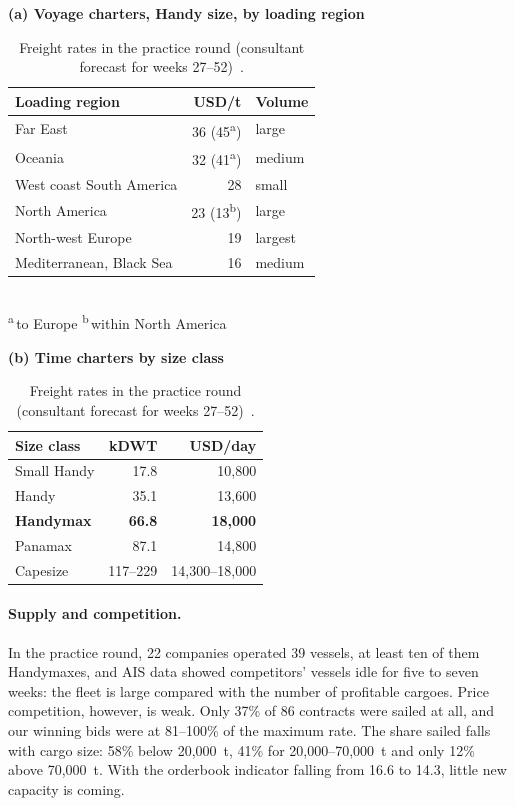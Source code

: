 \begin{table}[tbp]
  \centering\small
  \caption{Freight rates in the practice round (consultant forecast for weeks 27--52)~\cite{MBGpractice}.}
  \label{tab:rates}
  \begin{minipage}[t]{0.53\textwidth}
    \centering
    \textbf{(a) Voyage charters, Handy size, by loading region}\\[3pt]
    \begin{tabular}{@{}lrl@{}}
      \toprule
      Loading region & USD/t & Volume \\
      \midrule
      Far East                  & 36 (45\textsuperscript{a}) & large \\
      Oceania                   & 32 (41\textsuperscript{a}) & medium \\
      West coast South America  & 28 & small \\
      North America             & 23 (13\textsuperscript{b}) & large \\
      North-west Europe         & 19 & largest \\
      Mediterranean, Black Sea  & 16 & medium \\
      \bottomrule
    \end{tabular}\\[2pt]
    {\footnotesize \textsuperscript{a}\,to Europe \quad \textsuperscript{b}\,within North America}
  \end{minipage}\hfill
  \begin{minipage}[t]{0.43\textwidth}
    \centering
    \textbf{(b) Time charters by size class}\\[3pt]
    \begin{tabular}{@{}lrr@{}}
      \toprule
      Size class & kDWT & USD/day \\
      \midrule
      Small Handy      & 17.8    & 10,800 \\
      Handy            & 35.1    & 13,600 \\
      \textbf{Handymax} & \textbf{66.8} & \textbf{18,000} \\
      Panamax          & 87.1    & 14,800 \\
      Capesize         & 117--229 & 14,300--18,000 \\
      \bottomrule
    \end{tabular}
  \end{minipage}
\end{table}

\paragraph{Supply and competition.} In the practice round, 22 companies operated 39 vessels, at least ten of them Handymaxes, and AIS data showed competitors' vessels idle for five to seven weeks: the fleet is large compared with the number of profitable cargoes. Price competition, however, is weak. Only 37\% of 86 contracts were sailed at all, and our winning bids were at 81--100\% of the maximum rate. The share sailed falls with cargo size: 58\% below 20,000~t, 41\% for 20,000--70,000~t and only 12\% above 70,000~t. With the orderbook indicator falling from 16.6 to 14.3, little new capacity is coming.

